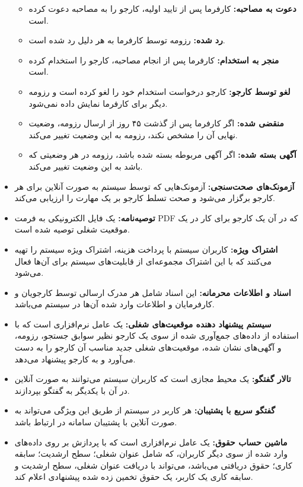 \documentclass[12pt]{article}
\begin{document}
\begin{itemize}
\begin{itemize}
			\item
			\textbf{دعوت به مصاحبه:}
			کارفرما پس از تایید اولیه، کارجو را به مصاحبه دعوت کرده است.
			\item
			\textbf{رد شده:}
			رزومه توسط کارفرما به هر دلیل رد شده است.
			\item
			\textbf{منجر به استخدام:}
			کارفرما پس از انجام مصاحبه، کارجو را استخدام کرده است.
			\item
			\textbf{لغو توسط کارجو:}
			کارجو درخواست استخدام خود را لغو کرده است و رزومه دیگر برای کارفرما نمایش داده نمی‌شود.
			\item
			\textbf{منقضی شده:}
			اگر کارفرما پس از گذشت ۴۵ روز از ارسال رزومه،‌ وضعیت نهایی آن را مشخص نکند، رزومه به این وضعیت تغییر می‌کند.
			\item
			\textbf{آگهی بسته شده:}
			اگر آگهی مربوطه بسته شده باشد، رزومه در هر وضعیتی که باشد به این وضعیت تغییر می‌کند.
		\end{itemize}
		\item
		\textbf{آزمونک‌های صحت‌سنجی:}
		 آزمونک‌هایی که توسط سیستم به صورت آنلاین برای هر کارجو برگزار می‌شود و صحت تسلط کارجو بر یک مهارت را ارزیابی می‌کند.
		\item
		\textbf{توصیه‌نامه:}
		 یک فایل الکترونیکی به فرمت PDF که در آن یک کارجو برای کار در یک موقعیت شغلی توصیه شده است.
		\item
		\textbf{اشتراک ویژه:}
		کاربران سیستم با پرداخت هزینه‌‌‌، اشتراک ویژه سیستم را تهیه می‌کنند که با این اشتراک مجموعه‌ای از قابلیت‌های سیستم برای آن‌ها فعال می‌شود.
		\item
		\textbf{اسناد و اطلاعات محرمانه:}
		این اسناد شامل هر مدرک ارسالی توسط کارجویان و کارفرمایان و اطلاعات وارد شده آن‌ها در سیستم می‌باشد.
		\item
		\textbf{سیستم پیشنهاد دهنده موقعیت‌های شغلی:}
		یک عامل نرم‌افزاری است که با استفاده از داده‌های جمع‌آوری شده از سوی یک کارجو نظیر سوابق جستجو، رزومه، و آگهی‌های نشان شده، موقعیت‌های شغلی جدید مناسب آن کارجو را به دست می‌آورد و به کارجو پیشنهاد می‌دهد.
		\item
		\textbf{تالار گفتگو:}
		یک محیط مجازی است که کاربران سیستم می‌توانند به صورت آنلاین در آن با یکدیگر به گفتگو بپردازند.
		\item
		\textbf{گفتگو سریع با پشتیبان:}
		هر کاربر در سیستم از طریق این ویژگی می‌تواند به صورت آنلاین با پشتیبان سامانه در ارتباط باشد.
		\item
		\textbf{ماشین حساب حقوق:}
		یک عامل نرم‌افزاری است که با پردازش بر روی داده‌های وارد شده از سوی دیگر کاربران، که شامل عنوان شغلی؛ سطح ارشدیت؛ سابقه کاری؛ حقوق دریافتی می‌باشد، می‌تواند با دریافت عنوان شغلی، سطح ارشدیت و سابقه کاری یک کاربر، یک حقوق تخمین زده شده پیشنهادی اعلام کند.

\end{itemize}
\end{document}
